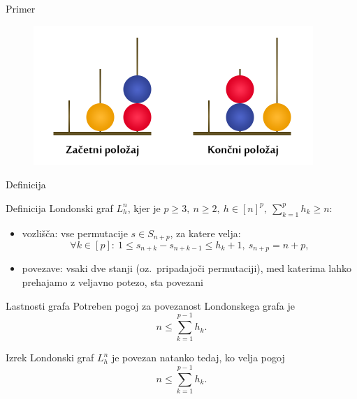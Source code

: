 \documentclass{beamer}
\begin{document}
\begin{frame}{Primer}
    \begin{figure}
        \centering
        \includegraphics[height=150pt]{../img/london-tower.png}
    \end{figure}
\end{frame}

\begin{frame}{Definicija}
    \begin{block}{Definicija}
        \alert{Londonski graf} $L_h^n$, kjer je $p \geq 3,\ n \geq 2,\ h \in [n]^p,\  \sum_{k=1}^p h_k \geq n$:
        \begin{itemize}
            \item vozlišča: vse permutacije $s \in S_{n+p}$, za katere velja:
            \[\forall k \in [p]:\ 1 \leq s_{n+k} - s_{n+k-1} \leq h_k + 1,\ s_{n+p} = n + p ,\]
            \item povezave: vsaki dve stanji (oz.\ pripadajoči permutaciji), med katerima lahko prehajamo z veljavno potezo, sta povezani
        \end{itemize}
    \end{block}

\end{frame}

\begin{frame}{Lastnosti grafa}
    Potreben pogoj za povezanost Londonskega grafa je 
    \[ n \leq \sum_{k=1}^{p-1} h_k. \]
    \begin{block}{Izrek}
        Londonski graf $L_h^n$ je povezan natanko tedaj, ko velja pogoj
        \[ n \leq \sum_{k=1}^{p-1} h_k. \]
    \end{block}
\end{frame}
\end{document}
